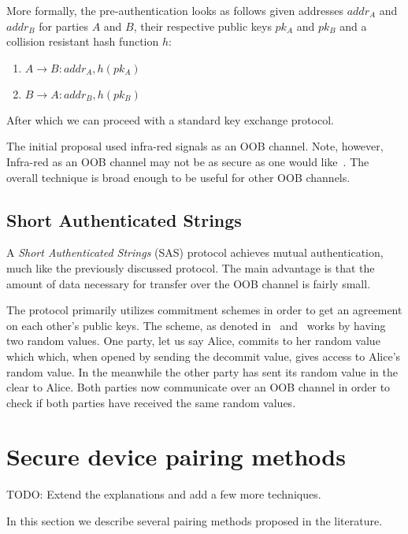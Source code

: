 \documentclass[conference, 11pt]{sty/IEEEtran}
\begin{document}
More formally, the pre-authentication looks as follows given addresses $addr_A$ and $addr_B$ for parties $A$ and $B$, their respective public keys $pk_A$ and $pk_B$ and a collision resistant hash function $h$:

\begin{enumerate}
    \item $A \rightarrow B: addr_A, h(pk_A)$
    \item $B \rightarrow A: addr_B, h(pk_B)$
\end{enumerate}

After which we can proceed with a standard key exchange protocol.

The initial proposal used infra-red signals as an OOB channel.
Note, however, Infra-red as an OOB channel may not be as secure as one would like~\cite{kumar2009comparative}.
The overall technique is broad enough to be useful for other OOB channels.

\subsection{Short Authenticated Strings}
\label{ssec:short_authenticated_strings}

A \emph{Short Authenticated Strings} (SAS) protocol achieves mutual authentication, much like the previously discussed protocol.
The main advantage is that the amount of data necessary for transfer over the OOB channel is fairly small.

The protocol primarily utilizes commitment schemes in order to get an agreement on each other's public keys.
The scheme, as denoted in~\cite{saxena2008automated} and~\cite{saxena2006secure} works by having two random values.
One party, let us say Alice, commits to her random value which which, when opened by sending the decommit value, gives access to Alice's random value.
In the meanwhile the other party has sent its random value in the clear to Alice.
Both parties now communicate over an OOB channel in order to check if both parties have received the same random values.

\section{Secure device pairing methods}
\label{sec:secure_device_pairing_methods}

TODO: Extend the explanations and add a few more techniques.

In this section we describe several pairing methods proposed in the literature.
\end{document}
